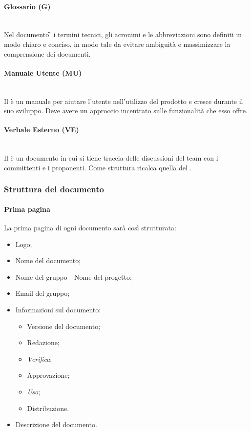 	\paragraph{Glossario (G)}
	~\\Nel documento \G{} i termini tecnici, gli acronimi e le abbreviazioni sono definiti in modo chiaro e conciso, in modo tale da evitare ambiguità e massimizzare la comprensione dei documenti.
	\paragraph{Manuale Utente (MU)}
	~\\Il \MU{} è un manuale per aiutare l'utente nell'utilizzo del prodotto e cresce durante il suo sviluppo. Deve avere un approccio incentrato sulle funzionalità che esso offre.
	\paragraph{Verbale Esterno (VE)}
	~\\Il \VE{} è un documento in cui si tiene traccia delle discussioni del team con i committenti e i proponenti. Come struttura ricalca quella del \VI.
	
	\subsubsection{Struttura del documento}
	\paragraph{Prima pagina}
	La prima pagina di ogni documento sarà così strutturata:
	\begin{itemize}
		\item Logo;
		\item Nome del documento;
		\item Nome del gruppo \emph{-} Nome del progetto;
		\item Email del gruppo;
		\item Informazioni sul documento:
		\begin{itemize}
			\item Versione del documento;
			\item Redazione;
			\item \emph{Verifica};
			\item Approvazione;
			\item \emph{Uso};
			\item Distribuzione.
		\end{itemize}
		\item Descrizione del documento.
	\end{itemize}

